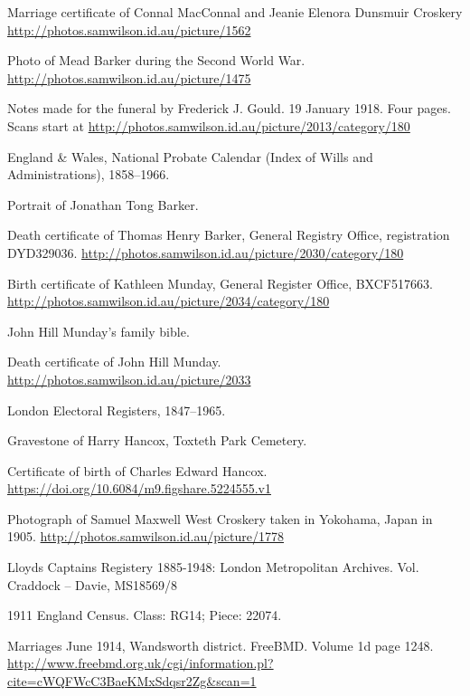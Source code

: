 \begin{thebibliography}{99}
	Marriage certificate of Connal MacConnal and Jeanie Elenora Dunsmuir Croskery
	\url{http://photos.samwilson.id.au/picture/1562}

	Photo of Mead Barker during the Second World War. \\
	\url{http://photos.samwilson.id.au/picture/1475}

	Notes made for the funeral by Frederick J. Gould. 19 January 1918.
	Four pages. Scans start at \url{http://photos.samwilson.id.au/picture/2013/category/180}

	England \& Wales, National Probate Calendar (Index of Wills and Administrations), 1858--1966.

	Portrait of Jonathan Tong Barker. \url{}

	Death certificate of Thomas Henry Barker, General Registry Office, registration DYD329036.
	\url{http://photos.samwilson.id.au/picture/2030/category/180}

	Birth certificate of Kathleen Munday, General Register Office, BXCF517663.
	\url{http://photos.samwilson.id.au/picture/2034/category/180}

	John Hill Munday's family bible.

	Death certificate of John Hill Munday.
	\url{http://photos.samwilson.id.au/picture/2033}

	London Electoral Registers, 1847--1965.

	Gravestone of Harry Hancox, Toxteth Park Cemetery.

	Certificate of birth of Charles Edward Hancox.
	\url{https://doi.org/10.6084/m9.figshare.5224555.v1}

	Photograph of Samuel Maxwell West Croskery taken in Yokohama, Japan in 1905.
	\url{http://photos.samwilson.id.au/picture/1778}

	Lloyds Captains Registery 1885-1948: London Metropolitan Archives. Vol. Craddock -- Davie, MS18569/8

	1911 England Census. Class: RG14; Piece: 22074.

	Marriages June 1914, Wandsworth district. FreeBMD. Volume 1d page 1248.
	\url{http://www.freebmd.org.uk/cgi/information.pl?cite=cWQFWcC3BaeKMxSdqsr2Zg&scan=1}


\end{thebibliography}
